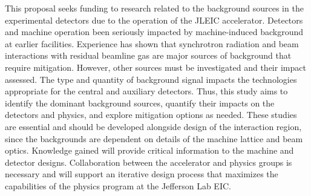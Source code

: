 This proposal seeks funding to research related to the background sources in the experimental detectors due to the operation of the JLEIC accelerator.  Detectors and machine operation been seriously impacted by machine-induced background at earlier facilities.  Experience has shown that synchrotron radiation and beam interactions with residual beamline gas are major sources of background that require mitigation.  However, other sources must be investigated and their impact assessed.  The type and quantity of background signal impacts the technologies appropriate for the central and auxiliary detectors.  Thus, this study aims to identify the dominant background sources, quantify their impacts on the detectors and physics, and explore mitigation options as needed.  These studies are essential and should be developed alongside design of the interaction region, since the backgrounds are dependent on details of the machine lattice and beam optics.  Knowledge gained will provide critical information to the machine and detector designs.  Collaboration between the accelerator and physics groups is necessary and will support an iterative design process that maximizes the capabilities of the physics program at the Jefferson Lab EIC.


